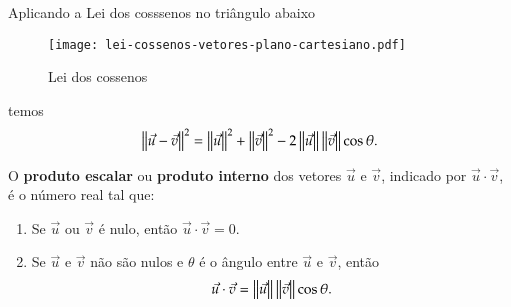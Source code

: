 Aplicando a Lei dos cosssenos no tri\^angulo abaixo
\begin{figure}[!h]
  \centering
  \caption{Lei dos cossenos}
  \texttt{[image: lei-cossenos-vetores-plano-cartesiano.pdf]}


\end{figure}
temos
\begin{align}\label{equacaonorma}
  \left\Vert{\vec{u} - \vec{v}}\right\Vert^2 = \left\Vert{\vec{u}}\right\Vert^2 + \left\Vert{\vec{v}}\right\Vert^2 - 2\left\Vert{\vec{u}}\right\Vert\left\Vert{\vec{v}}\right\Vert\cos\theta.
\end{align}



\begin{definicao}\label{produtointerno}
  O \textbf{produto escalar} ou \textbf{produto interno} dos vetores $\vec{u}$ e $\vec{v}$, indicado por $\vec{u}\cdot\vec{v}$, \'e o n\'umero real tal que:
  \begin{enumerate}
    \item Se $\vec{u}$ ou $\vec{v}$ \'e nulo, ent\~ao $\vec{u}\cdot\vec{v} = 0$.
    \item Se $\vec{u}$ e $\vec{v}$ n\~ao s\~ao nulos e $\theta$ \'e o \^angulo entre $\vec{u}$ e $\vec{v}$, ent\~ao
    \begin{align}\label{produto-interno}
      \vec{u}\cdot\vec{v} = \left\Vert{\vec{u}}\right\Vert\left\Vert{\vec{v}}\right\Vert\cos\theta.
    \end{align}
  \end{enumerate}
\end{definicao}

